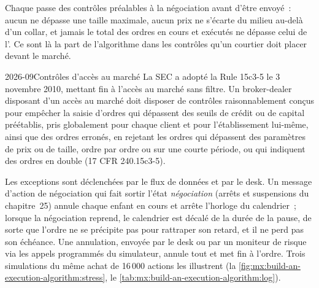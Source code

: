 Chaque  passe des contrôles préalables à la négociation avant d'être envoyé~: aucun ne dépasse une taille maximale, aucun prix ne s'écarte du milieu au-delà d'un collar, et jamais le total des ordres
en cours et exécutés ne dépasse celui de l'. Ce sont là la part de l'algorithme dans les contrôles qu'un courtier doit placer devant le marché.

\begin{dated}{2026-09}{Contrôles d'accès au marché}\label{dat:mx:build-an-execution-algorithm:access}
La SEC a adopté la Rule 15c3-5 le 3 novembre 2010, mettant fin à l'accès au marché sans filtre. Un broker-dealer disposant d'un accès au marché doit disposer de contrôles raisonnablement
conçus pour empêcher la saisie d'ordres qui dépassent des seuils de crédit ou de capital préétablis, pris globalement pour chaque client et pour l'établissement lui-même, ainsi que
des ordres erronés, en rejetant les ordres qui dépassent des paramètres de prix ou de taille, ordre par ordre ou sur une courte période, ou qui indiquent
des ordres en double (17 CFR 240.15c3-5).
\end{dated}

\label{lst:mx:build-an-execution-algorithm:controls}

Les exceptions sont déclenchées par le flux de données et par le desk. Un message d'action de négociation qui fait sortir l'état \emph{négociation} (arrêts et suspensions du chapitre~25)
annule chaque enfant en cours et arrête l'horloge du calendrier~; lorsque la négociation reprend, le calendrier est décalé de la durée de la pause, de sorte que l'ordre ne se précipite
pas pour rattraper son retard, et il ne perd pas son échéance. Une annulation, envoyée par le desk ou par un moniteur de risque via les appels programmés du simulateur, annule tout et met fin à l'ordre.
Trois simulations du même achat de 16\,000 actions les illustrent (la \cref{fig:mx:build-an-execution-algorithm:stress}, le \cref{tab:mx:build-an-execution-algorithm:log}).

